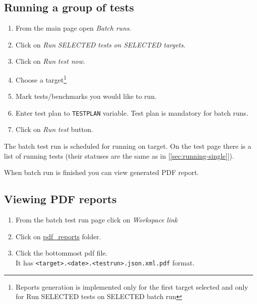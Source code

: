 \subsection{Running a group of tests}
\label{sec:running-batch}

\begin{enumerate}
\item From the main page open \textit{Batch runs}.
\item Click on \textit{Run SELECTED tests on SELECTED targets}.
\item Click on \textit{Run test now}.
\item Choose a target\footnote{Reports generation is implemented only for the first target selected and only for Run SELECTED tests on SELECTED batch run}
\item Mark tests/benchmarks you would like to run.
\item Enter test plan to \texttt{TESTPLAN} variable. Test plan is mandatory for batch runs.
\item Click on \textit{Run test} button.
\end{enumerate}

The batch test run is scheduled for running on target. On the test page there is a list of running tests (their statuses are the same as in [\ref{sec:running-single}]).

When batch run is finished you can view generated PDF report.

\subsection{Viewing PDF reports}
\label{sec:view-pdf}
\begin{enumerate}
 \item From the batch test run page click on \textit{Workspace link}
\item Click on
  \href{http://localhost:8090/view/batch\%20runs/job/Run\%20SELECTED\%20tests\%20on\%20SELECTED\%20targets/ws/pdf\_reports/}{pdf\_reports} folder.
\item Click the bottommost pdf file. \\ It has \texttt{<target>.<date>.<testrun>.json.xml.pdf} format.

\end{enumerate}

